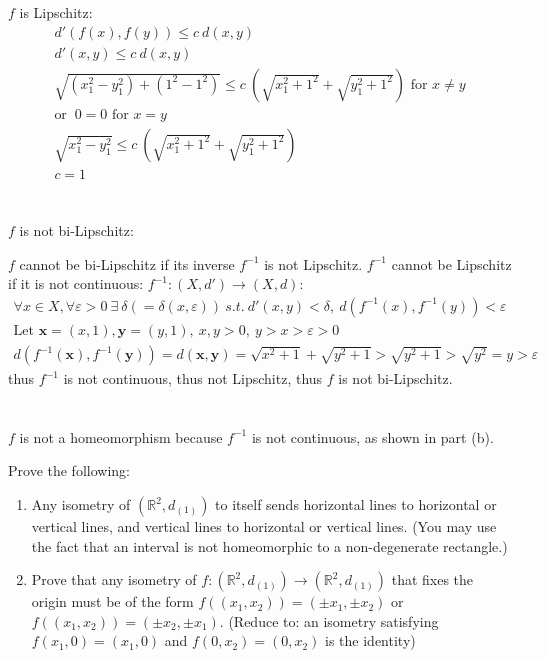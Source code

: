\documentclass{jhwhw}
\begin{document}
\solution{}
\part{}
$f$ is Lipschitz:
\begin{gather}
d'(f(x),f(y)) \le c\: d(x,y)\\
d'(x,y) \le c \: d(x,y)\\
\sqrt{(x_1^2-y_1^2)+(1^2-1^2)} \le c\: \left(\sqrt{x_1^2+1^2}+\sqrt{y_1^2+1^2}\right) \text{ for } x\ne y\\
 \text{or }\:0=0 \text{ for } x= y\\
\sqrt{x_1^2-y_1^2} \le c\: \left(\sqrt{x_1^2+1^2}+\sqrt{y_1^2+1^2}\right)\\
c = 1 
\end{gather}
\part{}
$f$ is not bi-Lipschitz:

$f$ cannot be bi-Lipschitz if its inverse $f^{-1}$ is not Lipschitz. $f^{-1}$ cannot be Lipschitz if it is not continuous:
$f^{-1}:(X,d')\to(X,d)$:
\begin{gather}
\forall x\in X,\forall \varepsilon >0 \:\exists \:\delta (=\delta (x,\varepsilon) )\: s.t.\: d'(x,y) < \delta, \: d(f^{-1}(x),f^{-1}(y)) < \varepsilon \\
\text{Let } \mathbf{x}=(x,1), \mathbf{y}=(y,1),\: x,y>0,\:y>x>\varepsilon>0\\
d(f^{-1}(\mathbf{x}),f^{-1}(\mathbf{y})) =d(\mathbf{x},\mathbf{y})= \sqrt{x^2 +1}+\sqrt{y^2+1}> \sqrt{y^2+1} > \sqrt{y^2} =y>\varepsilon
\end{gather}
thus $f^{-1}$ is not continuous, thus not Lipschitz, thus $f$ is not bi-Lipschitz.



\part{}
$f$ is not a homeomorphism because $f^{-1}$ is not continuous, as shown in part (b).


\problem{}%
 Prove the following: 
 \begin{enumerate}
	\item Any isometry of $(\mathbb{R}^2,d_{(1)})$  to itself sends horizontal lines to horizontal or vertical lines, and vertical lines to horizontal or vertical lines.
	(You may use the fact that an interval is not homeomorphic to a non-degenerate rectangle.)
	
	\item Prove that any isometry of $f:(\mathbb{R}^2,d_{(1)})\to (\mathbb{R}^2,d_{(1)})$ that fixes the origin must be of the form $f((x_1,x_2) )= (\pm x_1,\pm x_2)$ or $f((x_1,x_2)) = (\pm x_2, \pm x_1)$.  (Reduce to: an isometry satisfying $f(x_1,0) = (x_1,0)$ and $f(0,x_2) = (0,x_2)$ is the identity)
\end{enumerate}
\end{document}
